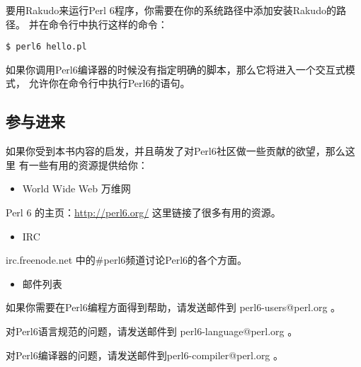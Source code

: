 \documentclass{ctexart}
\begin{document}
要用Rakudo来运行Perl 6程序，你需要在你的系统路径中添加安装Rakudo的路径。
并在命令行中执行这样的命令：

\begin{lstlisting}
$ perl6 hello.pl
\end{lstlisting}
如果你调用Perl6编译器的时候没有指定明确的脚本，那么它将进入一个交互式模式，
允许你在命令行中执行Perl6的语句。
\subsection{参与进来}
\label{sec-2-7}

如果你受到本书内容的启发，并且萌发了对Perl6社区做一些贡献的欲望，那么这里
有一些有用的资源提供给你：
\begin{itemize}
\item World Wide Web 万维网
\end{itemize}
Perl 6 的主页：\href{http://perl6.org/}{http://perl6.org/} 这里链接了很多有用的资源。
\begin{itemize}
\item IRC
\end{itemize}
irc.freenode.net 中的\#perl6频道讨论Perl6的各个方面。
\begin{itemize}
\item 邮件列表
\end{itemize}
如果你需要在Perl6编程方面得到帮助，请发送邮件到 perl6-users@perl.org 。

对Perl6语言规范的问题，请发送邮件到 perl6-language@perl.org 。

对Perl6编译器的问题，请发送邮件到perl6-compiler@perl.org 。
\end{document}
